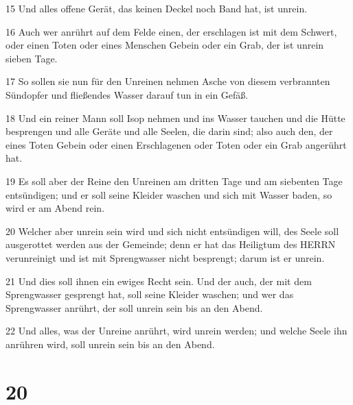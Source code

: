 \par 15 Und alles offene Gerät, das keinen Deckel noch Band hat, ist unrein.
\par 16 Auch wer anrührt auf dem Felde einen, der erschlagen ist mit dem Schwert, oder einen Toten oder eines Menschen Gebein oder ein Grab, der ist unrein sieben Tage.
\par 17 So sollen sie nun für den Unreinen nehmen Asche von diesem verbrannten Sündopfer und fließendes Wasser darauf tun in ein Gefäß.
\par 18 Und ein reiner Mann soll Isop nehmen und ins Wasser tauchen und die Hütte besprengen und alle Geräte und alle Seelen, die darin sind; also auch den, der eines Toten Gebein oder einen Erschlagenen oder Toten oder ein Grab angerührt hat.
\par 19 Es soll aber der Reine den Unreinen am dritten Tage und am siebenten Tage entsündigen; und er soll seine Kleider waschen und sich mit Wasser baden, so wird er am Abend rein.
\par 20 Welcher aber unrein sein wird und sich nicht entsündigen will, des Seele soll ausgerottet werden aus der Gemeinde; denn er hat das Heiligtum des HERRN verunreinigt und ist mit Sprengwasser nicht besprengt; darum ist er unrein.
\par 21 Und dies soll ihnen ein ewiges Recht sein. Und der auch, der mit dem Sprengwasser gesprengt hat, soll seine Kleider waschen; und wer das Sprengwasser anrührt, der soll unrein sein bis an den Abend.
\par 22 Und alles, was der Unreine anrührt, wird unrein werden; und welche Seele ihn anrühren wird, soll unrein sein bis an den Abend.

\chapter{20}

